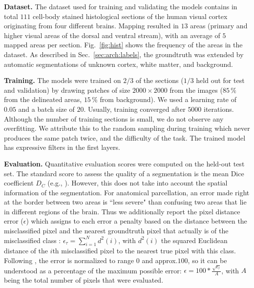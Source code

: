 \documentclass{article}
\begin{document}

\textbf{Dataset.}
The dataset used for training and validating the models contains in total $111$ cell-body stained histological sections of the human visual cortex originating from four different brains.
Mapping resulted in $13$ areas (primary and higher visual areas of the dorsal and ventral stream), with an average of $5$ mapped areas per section.
Fig.~\ref{fig:hist} shows the frequency of the areas in the dataset.
As described in Sec.~\ref{sec:arch:labels}, the groundtruth was extended by automatic segmentations of unknown cortex, white matter, and background.

\textbf{Training.}
The models were trained on $2/3$ of the sections ($1/3$ held out for test and validation) by drawing patches of size $2000\times2000$ from the images ($85\,\%$ from the delineated areas, $15\,\%$ from background).
We used a learning rate of $0.05$ and a batch size of $20$. Usually, training converged after $5000$ iterations.
Although the number of training sections is small, we do not observe any overfitting. We attribute this to the random sampling during training which never produces the same patch twice, and the difficulty of the task. The trained model has expressive filters in the first layers.

\textbf{Evaluation.}
Quantitative evaluation scores were computed on the held-out test set.
The standard score to assess the quality of a segmentation is the mean Dice coefficient $D_C$ (e.g., \cite{lee2011, brebisson2015}).
However, this does not take into account the spatial information of the segmentation.
For anatomical parcellation, an error made right at the border between two areas is ``less severe" than confusing two areas that lie in different regions of the brain.
Thus we additionally report the pixel distance error ($\epsilon$) which assigns to each error a penalty based on the distance between the misclassified pixel and the nearest groundtruth pixel that actually is of the misclassified class \cite{yasnoff1977}:
$\epsilon_{\tau} = \sum_{i=1}^{N} d^2(i)$, with $d^2(i)$ the squared Euclidean distance of the $i$th misclassified pixel to the nearest true pixel with this class.
Following \cite{yasnoff1977}, the error is normalized to range $0$ and approx.\;$100$, so it can be understood as a percentage of the maximum possible error:
$\epsilon = 100*\frac{\sqrt{\epsilon_{\tau}}}{A}$, with $A$ being the total number of pixels that were evaluated.
\end{document}
